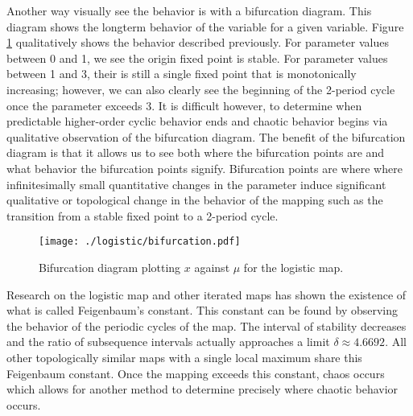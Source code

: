 Another way visually see the behavior is with a bifurcation diagram. This diagram shows the longterm behavior of the variable for a given variable. Figure \ref{log_bifurcation} qualitatively shows the behavior described previously. For parameter values between 0 and 1, we see the origin fixed point is stable. For parameter values between 1 and 3, their is still a single fixed point that is monotonically increasing; however, we can also clearly see the beginning of the 2-period cycle once the parameter exceeds 3. It is difficult however, to determine when predictable higher-order cyclic behavior ends and chaotic behavior begins via qualitative observation of the bifurcation diagram. The benefit of the bifurcation diagram is that it allows us to see both where the bifurcation points are and what behavior the bifurcation points signify. Bifurcation points are 
where where infinitesimally small quantitative changes in the parameter induce significant qualitative or topological change in the behavior of the mapping such as the transition from a stable fixed point to a 2-period cycle. 
\begin{figure}
    \centering
    \texttt{[image: ./logistic/bifurcation.pdf]}
    \caption{Bifurcation diagram plotting $x$ against $\mu$ for the logistic map.}
    \label{log_bifurcation}
\end{figure}

Research on the logistic map and other iterated maps has shown the existence of what is called Feigenbaum's constant. This constant can be found by observing the behavior of the periodic cycles of the map. The interval of stability decreases and the ratio of subsequence intervals actually approaches a limit $\delta\approx4.6692$\autocite{Puu2003}. All other topologically similar maps with a single local maximum share this Feigenbaum constant. Once the mapping exceeds this constant, chaos occurs which allows for another method to determine precisely where chaotic behavior occurs. 

